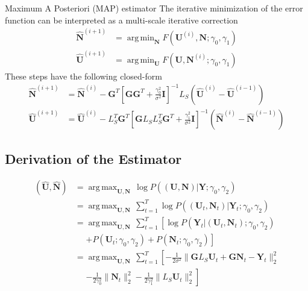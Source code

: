 \documentclass[progressbar=head]{beamer}
\newcommand{\ppar}[1]{ \left( #1 \right) }
\newcommand{\spar}[1]{ \left[ #1 \right] }
\DeclareMathOperator*{\argmax}{arg\,max}
\DeclareMathOperator*{\argmin}{arg\,min}
\newcommand{\nnorm}[1]{\lVert #1 \rVert}
\newcommand{\Y}{\mathbf{Y}}
\newcommand{\G}{\mathbf{G}}
\newcommand{\U}{\mathbf{U}}
\newcommand{\N}{\mathbf{N}}
\newcommand{\id}{\mathbf{I}}
\begin{document}
\begin{frame}{Maximum A Posteriori (MAP) estimator}
    The iterative minimization of the error function can be interpreted as a multi-scale iterative correction
    \begin{align}
        \hat{\N}^{(i+1)} &= \argmin_{\N} F\ppar{\U^{(i)},\N; \gamma_0, \gamma_1}
        \\
        \hat{\U}^{(i+1)} &= \argmin_{\U} F\ppar{\U,\N^{(i)}; \gamma_0, \gamma_1}
    \end{align}
    These steps have the following closed-form
    \begin{align}
        \hat{\N}^{(i+1)} &=
        \hat{\N}^{(i)}
        -
        \G^T \spar{\G \G^T + \frac{\gamma_0^2}{\sigma^2} \id}^{-1} L_S \ppar{\hat{\U}^{(i)}-\hat{\U}^{(i-1)} }
        \\
        \hat{\U}^{(i+1)} &=
        \hat{\U}^{(i)}
        -
        L_S^T \G^T \spar{\G L_S L_S^T \G^T + \frac{\gamma_1^2}{\sigma^2} \id}^{-1} \ppar{\hat{\N}^{(i)}-\hat{\N}^{(i-1)} }
    \end{align}
\end{frame}

{
\subsection{Derivation of the Estimator}
}

\begin{frame}
\begin{align*}
    \ppar{ \hat{\U}, \hat{\N} } &=
    \argmax_{\U, \N }\,
    \log P\ppar{\ppar{ {\U}, {\N} } \Big| {\Y; \gamma_0, \gamma_2} }
    \\
    &=
    \argmax_{\U, \N }\, \sum_{t=1}^T 
    \log P\ppar{\ppar{ {\U_t}, {\N_t} } \Big| {\Y_t; \gamma_0, \gamma_2} }
    \\
    &=
    \argmax_{\U, \N }\, \sum_{t=1}^T  \left[
    \log P\ppar{{ \Y_t } \Big| { \ppar{\U_t, \N_t}  ; \gamma_0, \gamma_2} }
    \right.
    \\
    &\phantom{=}
    \left.
    +
    P\ppar{{ {\U_t}  ; \gamma_0, \gamma_2} }
    +
    P\ppar{{ {\N_t}  ; \gamma_0, \gamma_2} }
    \right]
    \\
    &=
    \argmax_{\U, \N }\, \sum_{t=1}^T  \left[
    -\frac{1}{2\sigma^2}
    \nnorm{\G L_S \U_t + \G \N_t - \Y_t}_2^2
    \right.
    \\
    &\phantom{=}
    \left.
    -
    \frac{1}{2\gamma_0^2} \nnorm{\N_t}_2^2
    -
    \frac{1}{2\gamma_1^2} \nnorm{L_S \U_t}_2^2
    \right]
\end{align*}
\end{frame}
\end{document}
